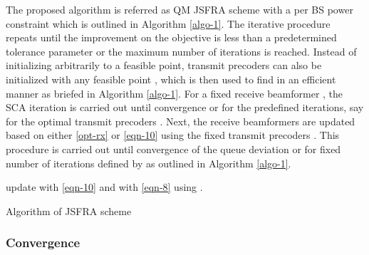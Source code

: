 The proposed algorithm is referred as \acl{QM} \ac{JSFRA} scheme with a per \ac{BS} power constraint which is outlined in Algorithm \ref{algo-1}. The iterative procedure repeats until the improvement on the objective is less than a predetermined tolerance parameter or the maximum number of iterations is reached. Instead of initializing  arbitrarily to a feasible point, transmit precoders can also be initialized with any feasible point , which is then used to find  in an efficient manner as briefed in Algorithm \ref{algo-1}. For a fixed receive beamformer , the \ac{SCA} iteration is carried out until convergence or for the predefined iterations, say  for the optimal transmit precoders . Next, the receive beamformers are updated based on either \eqref{opt-rx} or \eqref{eqn-10} using the fixed transmit precoders . This procedure is carried out until convergence of the queue deviation or for fixed number of iterations defined by  as outlined in Algorithm \ref{algo-1}.
\begin{algorithm}
 \SetAlgoLined
 \DontPrintSemicolon
 \BlankLine
 update  with \eqref{eqn-10} and  with \eqref{eqn-8} using .\;
 \caption{Algorithm of \acs{JSFRA} scheme}
 \label{algo-1}
\end{algorithm}

\subsubsection*{Convergence}

